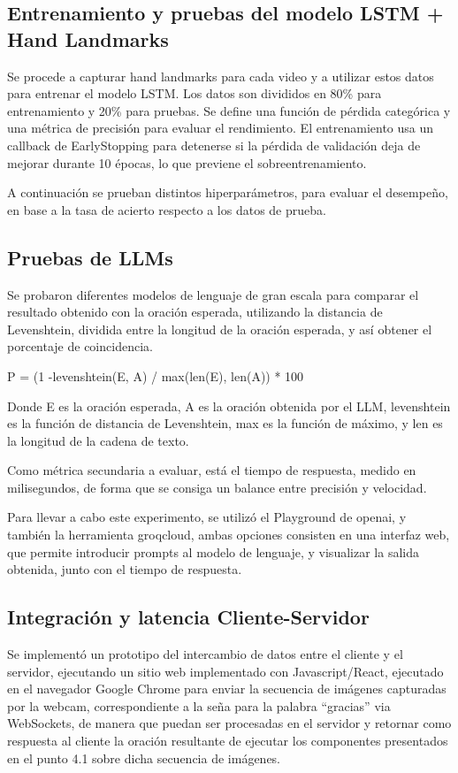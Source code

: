 \documentclass{article}
\begin{document}
\subsection{ Entrenamiento y pruebas del modelo LSTM + Hand Landmarks}
Se procede a capturar hand landmarks para cada video y a utilizar estos datos para entrenar el modelo LSTM. Los datos son divididos en 80\% para entrenamiento y 20\% para pruebas. Se define una función de pérdida categórica y una métrica de precisión para evaluar el rendimiento. El entrenamiento usa un callback de EarlyStopping para detenerse si la pérdida de validación deja de mejorar durante 10 épocas, lo que previene el sobreentrenamiento. 

A continuación se prueban distintos hiperparámetros, para evaluar el desempeño, en base a la tasa de acierto respecto a los datos de prueba.

\subsection{ Pruebas de LLMs }
Se probaron diferentes modelos de lenguaje de gran escala para comparar el resultado obtenido con la oración esperada, utilizando la distancia de Levenshtein, dividida entre la longitud de la oración esperada, y así obtener el porcentaje de coincidencia.

P = (1 -levenshtein(E, A) / max(len(E), len(A)) * 100

Donde E es la oración esperada, A es la oración obtenida por el LLM, levenshtein es la función de distancia de Levenshtein, max es la función de máximo, y len es la longitud de la cadena de texto.

Como métrica secundaria a evaluar, está el tiempo de respuesta, medido en milisegundos, de forma que se consiga un balance entre precisión y velocidad.

Para llevar a cabo este experimento, se utilizó el Playground de openai, y también la herramienta groqcloud, ambas opciones consisten en una interfaz web, que permite introducir prompts al modelo de lenguaje, y visualizar la salida obtenida, junto con el tiempo de respuesta.

\subsection{ Integración y latencia Cliente-Servidor }
Se implementó un prototipo del intercambio de datos entre el cliente y el servidor, ejecutando un sitio web implementado con Javascript/React, ejecutado en el navegador Google Chrome para enviar la secuencia de imágenes capturadas por la webcam, correspondiente a la seña para la palabra “gracias” via WebSockets, de manera que puedan ser procesadas en el servidor y retornar como respuesta al cliente la oración resultante de ejecutar los componentes presentados en el punto 4.1 sobre dicha secuencia de imágenes.
\end{document}
